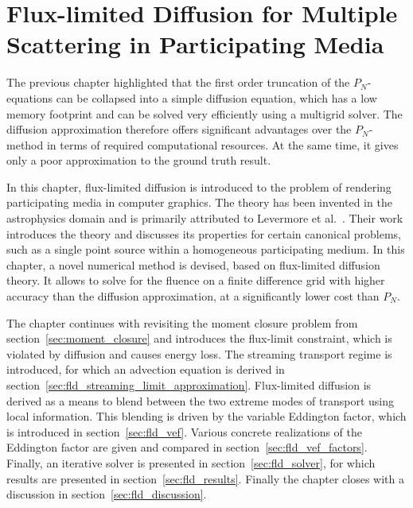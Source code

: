 \chapter{Flux-limited Diffusion for Multiple Scattering in Participating Media}
\label{sec:fld}

The previous chapter highlighted that the first order truncation of the $P_N$-equations can be collapsed into a simple diffusion equation, which has a low memory footprint and can be solved very efficiently using a multigrid solver. The diffusion approximation therefore offers significant advantages over the $P_N$-method in terms of required computational resources. At the same time, it gives only a poor approximation to the ground truth result.

In this chapter, flux-limited diffusion is introduced to the problem of rendering participating media in computer graphics. The theory has been invented in the astrophysics domain and is primarily attributed to Levermore et al.~\cite{Levermore81}. Their work introduces the theory and discusses its properties for certain canonical problems, such as a single point source within a homogeneous participating medium. In this chapter, a novel numerical method is devised, based on flux-limited diffusion theory. It allows to solve for the fluence on a finite difference grid with higher accuracy than the diffusion approximation, at a significantly lower cost than $P_N$.

The chapter continues with revisiting the moment closure problem from section~\ref{sec:moment_closure} and introduces the flux-limit constraint, which is violated by diffusion and causes energy loss. The streaming transport regime is introduced, for which an advection equation is derived in section~\ref{sec:fld_streaming_limit_approximation}. Flux-limited diffusion is derived as a means to blend between the two extreme modes of transport using local information. This blending is driven by the variable Eddington factor, which is introduced in section~\ref{sec:fld_vef}. Various concrete realizations of the Eddington factor are given and compared in section~\ref{sec:fld_vef_factors}. Finally, an iterative solver is presented in section~\ref{sec:fld_solver}, for which results are presented in section~\ref{sec:fld_results}. Finally the chapter closes with a discussion in section~\ref{sec:fld_discussion}.













